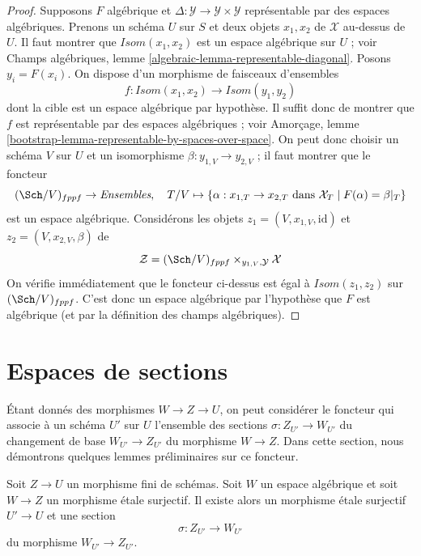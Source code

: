 \begin{proof}
Supposons $F$ algébrique et
$\Delta : \mathcal{Y} \to \mathcal{Y} \times \mathcal{Y}$
représentable par des espaces algébriques.
Prenons un schéma $U$ sur $S$ et deux objets $x_1, x_2$ de
$\mathcal{X}$ au-dessus de $U$.
Il faut montrer que $\mathit{Isom}(x_1, x_2)$ est un espace algébrique
sur $U$ ; voir
Champs algébriques, lemme \ref{algebraic-lemma-representable-diagonal}.
Posons $y_i = F(x_i)$. On dispose d'un morphisme de faisceaux d'ensembles
$$
f : \mathit{Isom}(x_1, x_2) \to \mathit{Isom}(y_1, y_2)
$$
dont la cible est un espace algébrique par hypothèse.
Il suffit donc de montrer que $f$ est représentable par des
espaces algébriques ; voir Amorçage, lemme
\ref{bootstrap-lemma-representable-by-spaces-over-space}.
On peut donc choisir un schéma $V$ sur $U$ et un
isomorphisme $\beta : y_{1, V} \to y_{2, V}$ ;
il faut montrer que le foncteur
$$
(\Sch/V)_{fppf} \to \textit{Ensembles},\quad
T/V \mapsto \{\alpha : x_{1, T} \to x_{2, T}
\text{ dans }\mathcal{X}_T \mid F(\alpha) = \beta|_T\}
$$
est un espace algébrique. Considérons les objets
$z_1 = (V, x_{1, V}, \text{id})$ et
$z_2 = (V, x_{2, V}, \beta)$ de
$$
\mathcal{Z} = (\Sch/V)_{fppf} \times_{y_{1, V}, \mathcal{Y}} \mathcal{X}
$$
On vérifie immédiatement que
le foncteur ci-dessus est égal à $\mathit{Isom}(z_1, z_2)$
sur $(\Sch/V)_{fppf}$. C'est donc un espace algébrique
par l'hypothèse que $F$ est algébrique (et par la définition
des champs algébriques).
\end{proof}
















\section{Espaces de sections}
\label{section-spaces-sections}

\noindent
Étant donnés des morphismes $W \to Z \to U$, on peut considérer le foncteur qui associe
à un schéma $U'$ sur $U$ l'ensemble des sections $\sigma : Z_{U'} \to W_{U'}$
du changement de base $W_{U'} \to Z_{U'}$ du morphisme $W \to Z$.
Dans cette section, nous démontrons quelques lemmes préliminaires sur ce foncteur.

\begin{lemma}
\label{lemma-surjection-space-of-sections}
Soit $Z \to U$ un morphisme fini de schémas.
Soit $W$ un espace algébrique et soit $W \to Z$ un
morphisme étale surjectif. Il existe alors un morphisme
étale surjectif $U' \to U$ et une section
$$
\sigma : Z_{U'} \to W_{U'}
$$
du morphisme $W_{U'} \to Z_{U'}$.
\end{lemma}

